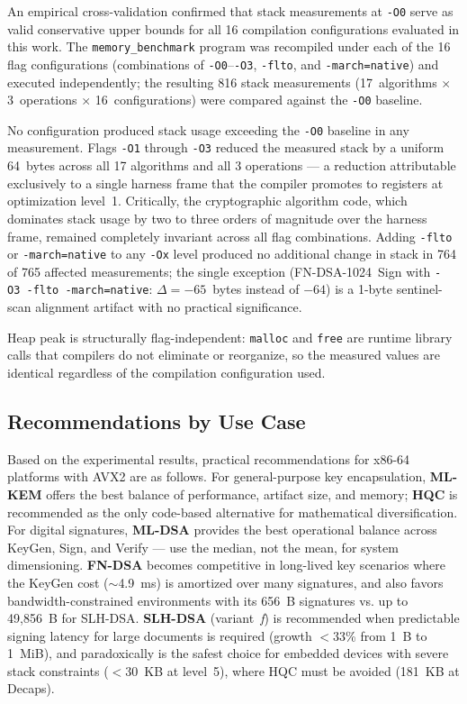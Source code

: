 \documentclass[12pt]{article}
\begin{document}
An empirical cross-validation confirmed that stack measurements at
\texttt{-O0} serve as valid conservative upper bounds for all 16 compilation
configurations evaluated in this work. The \texttt{memory\_benchmark} program
was recompiled under each of the 16 flag configurations (combinations of
\texttt{-O0}--\texttt{-O3}, \texttt{-flto}, and \texttt{-march=native})
and executed independently; the resulting 816 stack measurements
(17~algorithms $\times$ 3~operations $\times$ 16~configurations) were
compared against the \texttt{-O0} baseline.

No configuration produced stack usage exceeding the \texttt{-O0} baseline
in any measurement. Flags \texttt{-O1} through \texttt{-O3} reduced the
measured stack by a uniform 64~bytes across all 17 algorithms and all 3
operations --- a reduction attributable exclusively to a single harness
frame that the compiler promotes to registers at optimization level~1.
Critically, the cryptographic algorithm code, which dominates stack usage
by two to three orders of magnitude over the harness frame, remained
completely invariant across all flag combinations. Adding
\texttt{-flto} or \texttt{-march=native} to any \texttt{-Ox} level
produced no additional change in stack in 764 of 765 affected measurements;
the single exception (FN-DSA-1024~Sign with \texttt{-O3~-flto~-march=native}:
$\Delta = -65$~bytes instead of $-64$) is a 1-byte sentinel-scan alignment
artifact with no practical significance.

Heap peak is structurally flag-independent: \texttt{malloc} and \texttt{free}
are runtime library calls that compilers do not eliminate or reorganize,
so the measured values are identical regardless of the compilation
configuration used.

\subsection{Recommendations by Use Case}
\label{subsec:recomendacoes}
Based on the experimental results, practical recommendations for x86-64
platforms with AVX2 are as follows. For general-purpose key encapsulation,
\textbf{ML-KEM} offers the best balance of performance, artifact size, and
memory; \textbf{HQC} is recommended as the only code-based alternative for
mathematical diversification. For digital signatures, \textbf{ML-DSA}
provides the best operational balance across KeyGen, Sign, and Verify ---
use the median, not the mean, for system dimensioning. \textbf{FN-DSA}
becomes competitive in long-lived key scenarios where the KeyGen cost
($\sim$4.9~ms) is amortized over many signatures, and also favors
bandwidth-constrained environments with its 656~B signatures vs. up to
49,856~B for SLH-DSA. \textbf{SLH-DSA} (variant~\textit{f}) is recommended
when predictable signing latency for large documents is required (growth
$<$33\% from 1~B to 1~MiB), and paradoxically is the safest choice for
embedded devices with severe stack constraints ($<$30~KB at level~5),
where HQC must be avoided (181~KB at Decaps).
\end{document}
